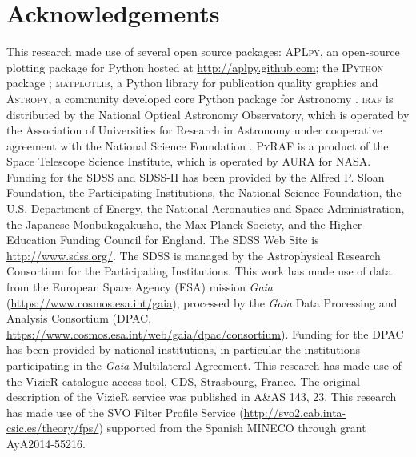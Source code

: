 \documentclass[apj, revtex4]{emulateapj}
\begin{document}
\section*{Acknowledgements} 
This research made use of several open source packages: \textsc{APLpy}, an open-source plotting package for Python hosted at \url{http://aplpy.github.com}; the \textsc{IPython} package \citep{Perez2007}; \textsc{matplotlib}, a Python library for publication quality graphics \citep{Hunter2007} and \textsc{Astropy}, a community developed core Python package for Astronomy \citep{TheAstropyCollaboration2013}.
\textsc{iraf} is distributed by the National Optical Astronomy Observatory, which is operated by the Association of Universities for Research in Astronomy under cooperative agreement with the National Science Foundation \citep{Tody1993}. 
\textsc{PyRAF} is a product of the Space Telescope Science Institute, which is operated by AURA for NASA. 
Funding for the SDSS and SDSS-II has been provided by the Alfred P. Sloan Foundation, the Participating Institutions, the National Science Foundation, the U.S. Department of Energy, the National Aeronautics and Space Administration, the Japanese Monbukagakusho, the Max Planck Society, and the Higher Education Funding Council for England. The SDSS Web Site is \url{http://www.sdss.org/}. The SDSS is managed by the Astrophysical Research Consortium for the Participating Institutions. 
This work has made use of data from the European Space Agency (ESA) mission {\it Gaia} (\url{https://www.cosmos.esa.int/gaia}), processed by the {\it Gaia} Data Processing and Analysis Consortium (DPAC, \url{https://www.cosmos.esa.int/web/gaia/dpac/consortium}). Funding for the DPAC has been provided by national institutions, in particular the institutions participating in the {\it Gaia} Multilateral Agreement.
This research has made use of the VizieR catalogue access tool, CDS, Strasbourg, France. The original description of the VizieR service was published in A\&AS 143, 23.
This research has made use of the SVO Filter Profile Service (\url{http://svo2.cab.inta-csic.es/theory/fps/}) supported from the Spanish MINECO through grant  AyA2014-55216.




\end{document}
